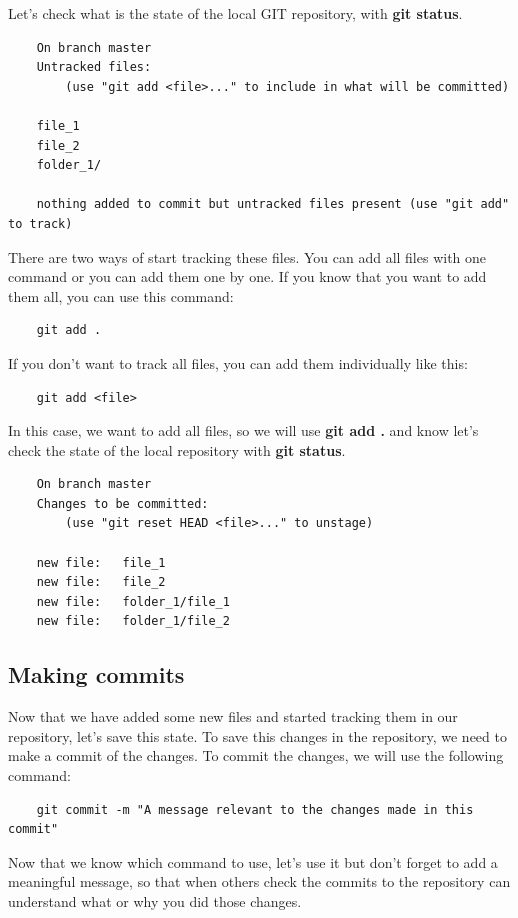 \documentclass{article}
\begin{document}
Let's check what is the state of the local GIT repository, with \textbf{git status}.

\begin{lstlisting}
	On branch master
	Untracked files:
		(use "git add <file>..." to include in what will be committed)

	file_1
	file_2
	folder_1/

	nothing added to commit but untracked files present (use "git add" to track)
\end{lstlisting}

There are two ways of start tracking these files. You can add all files with one command or you can add them one by one. If you know that you want to add them all, you can use this command:

\begin{lstlisting}
	git add .
\end{lstlisting}

If you don't want to track all files, you can add them individually like this:

\begin{lstlisting}
	git add <file>
\end{lstlisting}

In this case, we want to add all files, so we will use \textbf{git add .} and know let's check the state of the local repository with \textbf{git status}.

\begin{lstlisting}
	On branch master
	Changes to be committed:
  		(use "git reset HEAD <file>..." to unstage)

	new file:   file_1
	new file:   file_2
	new file:   folder_1/file_1
	new file:   folder_1/file_2
\end{lstlisting}

\subsection{Making commits}

Now that we have added some new files and started tracking them in our repository, let's save this state. To save this changes in the repository, we need to make a commit of the changes. To commit the changes, we will use the following command:

\begin{lstlisting}
	git commit -m "A message relevant to the changes made in this commit"
\end{lstlisting}

Now that we know which command to use, let's use it but don't forget to add a meaningful message, so that when others check the commits to the repository can understand what or why you did those changes.\\
\end{document}
